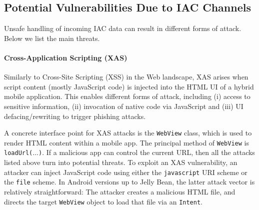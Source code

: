 
\subsection{Potential Vulnerabilities Due to IAC Channels}\label{Se:attackSurface}

Unsafe handling of incoming IAC data can result in different forms of attack. Below we list the main threats.

\paragraph{Cross-Application Scripting (XAS)} Similarly to Cross-Site Scripting (XSS) in the Web landscape, XAS arises when script content (mostly JavaScript code) is injected into the HTML UI of a hybrid mobile application. This enables different forms of attack, including (i) access to sensitive information, (ii) invocation of native code via JavaScript and (iii) UI defacing/rewriting to trigger phishing attacks.

A concrete interface point for XAS attacks is the {\tt WebView} class, which is used to render HTML content within a mobile app. The principal method of {\tt WebView} is {\tt loadUrl($\ldots$)}. If a malicious app can control the current URL, then all the attacks listed above turn into potential threats. 
%
To exploit an XAS vulnerability, an attacker can inject JavaScript code using either the {\tt javascript} URI scheme or the {\tt file} scheme. In Android versions up to Jelly Bean, the latter attack vector is relatively straightforward: The attacker creates a malicious HTML file, and directs the target {\tt WebView} object to load that file via an {\tt Intent}.
%

